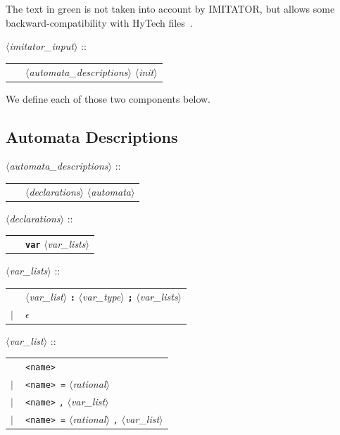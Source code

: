 \documentclass[a4paper,11pt]{report}
\newcommand{\emptystring}{$\epsilon$}
\newcommand{\hytech}{{\sc HyTech}}
\newcommand{\imitator}{\textsf{IMITATOR}}
\newcommand{\nt}[1]{$\langle$\emph{#1}$\rangle$}
\newcommand{\regleGrammaire}[1]{\bigskip \noindent \nt{#1} :: \\}
\newcommand{\npec}[1]{\textcolor{green!50!black}{#1}}
\newcommand{\code}[1]{\textbf{\texttt{#1}}}
\newcommand{\styleIMI}[1]{\textcolor{imicolor}{\texttt{#1}}}
\begin{document}
The text \npec{in green} is not taken into account by \imitator{}, but allows some backward-compatibility with \hytech{} files~\cite{HHW95}.


\regleGrammaire{imitator\_input}
\begin{tabular}{l l}
	\  & \nt{automata\_descriptions} \nt{init} \\
\end{tabular}

\medskip


We define each of those two components below.

\subsection{Automata Descriptions}

\regleGrammaire{automata\_descriptions}
\begin{tabular}{l l}
	\  & \nt{declarations} \nt{automata} \\
\end{tabular}

\regleGrammaire{declarations}
\begin{tabular}{l l}
	\  & \code{var} \nt{var\_lists} \\
\end{tabular}

\regleGrammaire{var\_lists}
\begin{tabular}{l l}
	\  & \nt{var\_list} \code{:} \nt{var\_type} \code{;} \nt{var\_lists} \\
	$|$ & \emptystring
\end{tabular}

\regleGrammaire{var\_list}
\begin{tabular}{l l}
	\  & \styleIMI{<name>} \\
	$|$ & \styleIMI{<name> =} \nt{rational} \\
	$|$ & \styleIMI{<name>} \styleIMI{,} \nt{var\_list}\\
	$|$ & \styleIMI{<name> =} \nt{rational} \styleIMI{,} \nt{var\_list}\\
\end{tabular}
\end{document}
